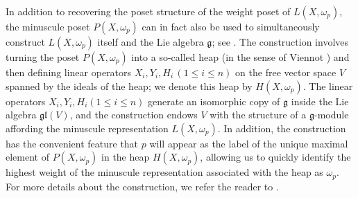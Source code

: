 \documentclass[11pt]{amsart}
\theoremstyle{plain}
\theoremstyle{definition}
\theoremstyle{remark}
\numberwithin{equation}{section}
\newcommand{\fg}{{\mathfrak g}}
\newcommand{\lxp}{L(X,\omega_p)}
\newcommand{\hxp}{H(X,\omega_p)}
\newcommand{\pxp}{P(X,\omega_p)}
\begin{document}
In addition to recovering the poset structure of the weight poset of $\lxp$,
the minuscule poset $\pxp$ can in fact also be used to simultaneously construct
$\lxp$ itself and the Lie algebra $\fg$; see \cite{wildberger,whatis}. The
construction involves turning the poset $\pxp$ into a so-called heap (in the
sense of Viennot \cite{viennot}) and then defining linear operators $X_i, Y_i,
H_i\,(1\le i\le n)$ on the free vector space $V$ spanned by the ideals of the
heap; we denote this heap by $H(X,\omega_p)$. The linear operators $X_i, Y_i,
H_i (1\le i\le n)$ generate an isomorphic copy of $\fg$ inside the Lie algebra
$\mathfrak{gl}(V)$, and the construction endows $V$ with the structure of a
$\fg$-module affording the minuscule representation $\lxp$.  In addition, the
construction has the convenient feature that $p$ will appear as the label of the
unique maximal element of $\pxp$ in the heap $\hxp$, allowing us to quickly
identify the highest weight of the minuscule representation associated with the
heap as $\omega_p$. For more details about the construction, we refer the reader
to \cite{wildberger,whatis,green13}.
\end{document}
